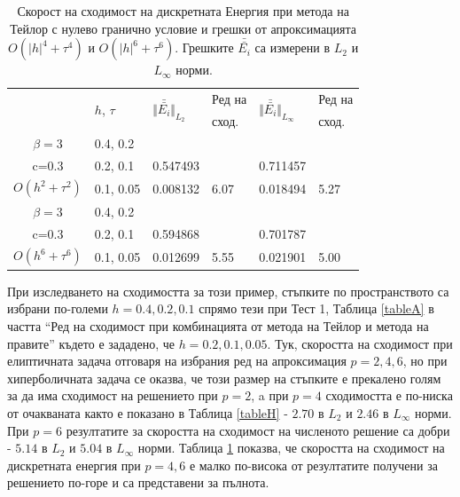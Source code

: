 \documentclass{article}
\theoremstyle{remark}
\begin{document}
\begin{table}[ht]
\centering
\small
		\begin{tabular}{||c|l|ll|ll||}
			\hline
			\hline
      \multirow{2  }{*}{ }        & \multirow{2  }{*}{$h$, $\tau$}  &  	\multirow{2  }{*}{ $\Vert \bar{\bar{ E_i}} \Vert_{L_2}$ }	&Ред на	& \multirow{2  }{*}{ $\Vert \bar{\bar{ E_i}} \Vert_{L_\infty}$ } 		&Ред на   \\
	                                        &                                                & 							 					&  сход. 	& 								       					& сход. \\
   			\hline 
					\hline 
       $\beta=3$       	&0.4, 0.2     		&             	&           &           		&   \\
                  c=0.3    	&0.2, 0.1     		& 0.547493 	&           &0.711457  		&   \\
$O(h^2+ \tau^2)$ 	&0.1, 0.05   		& 0.008132  	& 6.07  	& 0.018494  		& 5.27 \\
\hline
  $\beta=3$     	 	&0.4, 0.2   		&            	&         	&                  	&      \\
      c=0.3                 	&0.2, 0.1   		&0.594868	&         	& 0.701787      	&       \\
   $O(h^6+ \tau^6)$ &0.1, 0.05  		& 0.012699 	& 5.55 	& 0.021901  		& 5.00       \\
\hline
\hline 
		\end{tabular}
		\caption{Скорост на сходимост на дискретната Енергия при метода на Тейлор с нулево гранично условие и грешки от апроксимацията $O(|h|^{4} + \tau^4 )$ и $O(|h|^{6} + \tau^6 )$. Грешките $\bar{\bar{ E_i}}$ са измерени в $L_2$ и $L_\infty$ норми.}
\label{tableI}
\end{table}
\FloatBarrier

При изследването на сходимостта за този пример, стъпките по пространството са избрани по-големи $h=0.4, 0.2, 0.1$ спрямо тези при Тест 1, Таблица \ref{tableA} в частта ``Ред на сходимост при комбинацията от метода на Тейлор и метода на правите'' където е зададено, че $h=0.2, 0.1, 0.05$. Тук, скоростта на сходимост при елиптичната задача отговаря на избрания ред на апроксимация $p=2,4,6$, но при хиперболичната задача се оказва, че този размер на стъпките е прекалено голям за да има сходимост на решението при $p=2$, a при $p=4$ сходимостта е по-ниска от очакваната както е показано в Таблица \ref{tableH} - $2.70$ в $L_2$ и $2.46$ в $L_\infty$ норми. При $p=6$ резултатите за скоростта на сходимост на численото решение са добри - $5.14$ в $L_2$ и $5.04$ в $L_\infty$ норми. Таблица \ref{tableI} показва, че скоростта на сходимост на дискретната енергия при $p=4,6$ е малко по-висока от резултатите получени за решението по-горе и са представени за пълнота.
\end{document}

